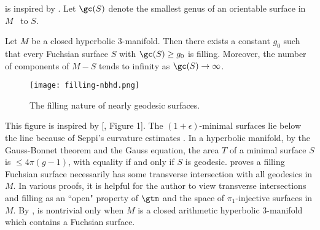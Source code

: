  is inspired by . Let $\gc(S)$ denote the smallest genus of an orientable surface in $M$ \cble \, to $S$.
\begin{theorem}\label{theorem large Fuchsian filling}
	Let $M$ be a closed hyperbolic $3$-manifold. Then there exists a constant $g_0$ such that every Fuchsian surface $S$ with $\gc(S) \geq g_0$ is filling. Moreover, the number of components of $M-S$ tends to infinity as $\gc(S)\rightarrow \infty$. 
\begin{figure}[h]
\centering
\texttt{[image: filling-nbhd.png]}
\caption{The filling nature of nearly geodesic surfaces.}
\label{filling-nbhd}
\end{figure}
\end{theorem}
This figure is inspired by [, Figure 1]. The $(1+\epsilon)$-\qf minimal surfaces lie below the line because of Seppi's curvature estimates \cite{saMinimalDiscsHyperbolicSpace}.
In a hyperbolic manifold, by the Gauss-Bonnet theorem and the Gauss equation, the area $T$ of a minimal surface $S$ is $\leq 4\pi(g-1)$, with equality if and only if $S$ is geodesic.  proves a filling Fuchsian surface necessarily has some transverse intersection with all geodesics in $M$. In various proofs, it is helpful for the author to view transverse intersections and filling as an ``open" property of $\gtm$ and the space of $\pi_1$-injective surfaces in $M$. By \cite{raGeodesicSurfacesHyperbolic,bfmsTotallyGeodesicSubmanifolds},  is nontrivial only when $M$ is a closed arithmetic hyperbolic $3$-manifold which contains a Fuchsian surface. 

